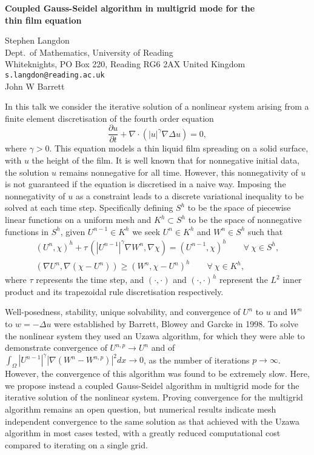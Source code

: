 \documentclass[twosided]{report}
\begin{document}
\begin{center}
{\large			%
{\bf Coupled Gauss-Seidel algorithm in multigrid mode for the \\
	thin film equation}}

	Stephen Langdon \\
	Dept.~of Mathematics, University of Reading \\
	Whiteknights, PO Box 220, Reading RG6 2AX United Kingdom \\
	{\tt s.langdon@reading.ac.uk} \\
	John W Barrett
\end{center}
In this talk we consider the iterative solution of a
nonlinear system arising from a finite element
discretisation of the fourth order equation \[
\frac{\partial u}{\partial t} + \nabla \cdot
(|u|^{\gamma}\nabla\Delta u) = 0, \] where $\gamma>0$. This
equation models a thin liquid film spreading on a solid
surface, with $u$ the height of the film. It is well known
that for nonnegative initial data, the solution $u$ remains
nonnegative for all time. However, this nonnegativity of $u$
is not guaranteed if the equation is discretised in a naive
way. Imposing the nonnegativity of $u$ as a constraint leads
to a discrete variational inequality to be solved at each
time step. Specifically defining $S^h$ to be the space of
piecewise linear functions on a uniform mesh and $K^h\subset
S^h$ to be the space of nonnegative functions in $S^h$,
given $U^{n-1}\in K^h$ we seek $U^{n} \in K^h$ and $W^n \in
S^h$ such that \begin{eqnarray*} &(U^{n},\chi)^h +
\tau\,(|U^{n-1}|^{\gamma}\nabla W^n,\nabla \chi) =
(U^{n-1},\chi)^h \qquad \forall \ \chi \in S^h,& \\ &(\nabla
U^{n},\nabla (\chi-U^{n})) \geq (W^{n}, \chi-U^n)^h \qquad
\forall \ \chi \in K^h,& \end{eqnarray*} where $\tau$
represents the time step, and $(\cdot,\cdot)$ and
$(\cdot,\cdot)^h$ represent the $L^2$ inner product and its
trapezoidal rule discretisation respectively.


Well-posedness, stability, unique solvability, and
convergence of $U^n$ to $u$ and $W^n$ to $w=-\Delta u$ were
established by Barrett, Blowey and Garcke in 1998. To solve
the nonlinear system they used an Uzawa algorithm, for which
they were able to demonstrate convergence of
$U^{n,p}\rightarrow U^n$ and of $\int_{\Omega}
|U^{n-1}|^{\gamma} |\nabla(W^n-W^{n,p})|^2 dx \rightarrow
0$, as the number of iterations $p\rightarrow\infty$.
However, the convergence of this algorithm was found to be
extremely slow. Here, we propose instead a coupled
Gauss-Seidel algorithm in multigrid mode for the iterative
solution of the nonlinear system. Proving convergence for
the multigrid algorithm remains an open question, but
numerical results indicate mesh independent convergence to
the same solution as that achieved with the Uzawa algorithm
in most cases tested, with a greatly reduced computational
cost compared to iterating on a single grid.
\end{document}
